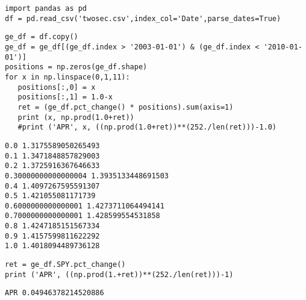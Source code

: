 \documentclass[12pt,fleqn]{article}\usepackage{../../common}
\begin{document}
\begin{verbatim}
import pandas as pd
df = pd.read_csv('twosec.csv',index_col='Date',parse_dates=True)
\end{verbatim}


\begin{verbatim}
ge_df = df.copy()
ge_df = ge_df[(ge_df.index > '2003-01-01') & (ge_df.index < '2010-01-01')]
positions = np.zeros(ge_df.shape)
for x in np.linspace(0,1,11):
   positions[:,0] = x
   positions[:,1] = 1.0-x
   ret = (ge_df.pct_change() * positions).sum(axis=1)
   print (x, np.prod(1.0+ret))
   #print ('APR', x, ((np.prod(1.0+ret))**(252./len(ret)))-1.0)
\end{verbatim}

\begin{verbatim}
0.0 1.3175589050265493
0.1 1.3471848857829003
0.2 1.3725916367646633
0.30000000000000004 1.3935133448691503
0.4 1.4097267595591307
0.5 1.421055081171739
0.6000000000000001 1.4273711064494141
0.7000000000000001 1.428599554531858
0.8 1.4247185151567334
0.9 1.4157599811622292
1.0 1.4018094489736128
\end{verbatim}


\begin{verbatim}
ret = ge_df.SPY.pct_change()
print ('APR', ((np.prod(1.+ret))**(252./len(ret)))-1)
\end{verbatim}

\begin{verbatim}
APR 0.04946378214520886
\end{verbatim}
\end{document}
